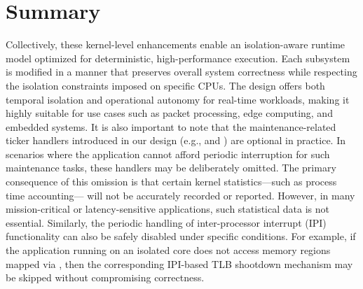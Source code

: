\documentclass[letterpaper]{article}
\begin{document}
\section{Summary}
Collectively, these kernel-level enhancements enable an isolation-aware runtime model optimized
for deterministic, high-performance execution. Each subsystem is modified in a manner that
preserves overall system correctness while respecting the isolation constraints imposed on
specific CPUs. The design offers both temporal isolation and operational autonomy for real-time
workloads, making it highly suitable for use cases such as packet processing, edge computing, and
embedded systems.
It is also important to note that the maintenance-related ticker handlers introduced in our design
(e.g., and ) are optional in practice. In scenarios where the application cannot afford periodic
interruption for such maintenance tasks, these handlers may be deliberately omitted. The primary
consequence of this omission is that certain kernel statistics—such as process time accounting—
will not be accurately recorded or reported. However, in many mission-critical or latency-sensitive
applications, such statistical data is not essential. Similarly, the periodic handling of inter-processor
interrupt (IPI) functionality can also be safely disabled under specific conditions. For example, if
the application running on an isolated core does not access memory regions mapped via , then the
corresponding IPI-based TLB shootdown mechanism may be skipped without compromising
correctness.
\newpage
 



% 
\end{document}
